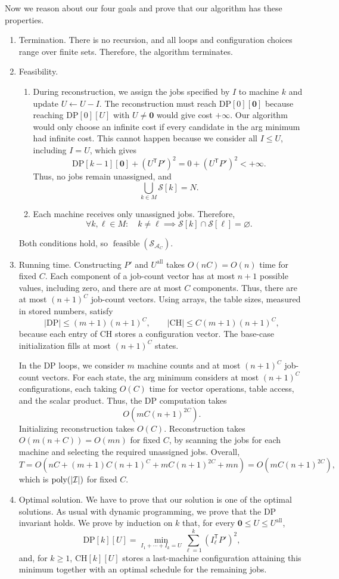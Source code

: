 \documentclass[12pt,a4paper]{article}
\begin{document}
Now we reason about our four goals and prove that our algorithm has these properties.
\begin{enumerate}
\item Termination. There is no recursion, and all loops and configuration
choices range over finite sets. Therefore, the algorithm terminates.
\item Feasibility.
\begin{enumerate}
\item During reconstruction, we assign the jobs specified by $I$ to machine
$k$ and update $U\gets U-I$. The reconstruction must reach
$\mathrm{DP}[0][\mathbf{0}]$ because reaching $\mathrm{DP}[0][U]$ with
$U\neq\mathbf{0}$ would give cost $+\infty$. Our algorithm would only
choose an infinite cost if every candidate in the arg minimum had infinite
cost. This cannot happen because we consider all $I\leq U$, including $I=U$,
which gives
\[
\mathrm{DP}[k-1][\mathbf{0}]+(U^{\mathsf T}P')^2
=0+(U^{\mathsf T}P')^2<+\infty.
\]
Thus, no jobs remain unassigned, and
\[
\bigcup_{k\in M}\mathcal{S}[k]=N.
\]
\item Each machine receives only unassigned jobs. Therefore,
\[
\forall k,\ell\in M:\quad
k\neq\ell\implies\mathcal{S}[k]\cap\mathcal{S}[\ell]=\varnothing.
\]
\end{enumerate}
Both conditions hold, so $\operatorname{feasible}(\mathcal{S}_{\mathcal{A}_C})$.
\item Running time. Constructing $P'$ and $U^{\mathrm{all}}$ takes
$O(nC)=O(n)$ time for fixed $C$. Each component of a job-count vector
has at most $n+1$ possible values, including zero, and there are at most
$C$ components. Thus, there are at most $(n+1)^C$ job-count vectors.
Using arrays, the table sizes, measured in stored numbers, satisfy
\[
|\mathrm{DP}|\leq(m+1)(n+1)^C,\qquad
|\mathrm{CH}|\leq C(m+1)(n+1)^C,
\]
because each entry of $\mathrm{CH}$ stores a configuration vector.
The base-case initialization fills at most $(n+1)^C$ states.

In the DP loops, we consider $m$ machine counts and at most $(n+1)^C$
job-count vectors. For each state, the arg minimum considers at most
$(n+1)^C$ configurations, each taking $O(C)$ time for vector operations,
table access, and the scalar product. Thus, the DP computation takes
\[
O\!\left(mC(n+1)^{2C}\right).
\]
Initializing reconstruction takes $O(C)$. Reconstruction takes $O(m(n+C))=O(mn)$
for fixed $C$, by scanning the jobs for each machine and selecting the
required unassigned jobs. Overall,
\[
T=O\!\left(nC+(m+1)C(n+1)^C+mC(n+1)^{2C}+mn\right)
=O\!\left(mC(n+1)^{2C}\right),
\]
which is $\operatorname{poly}(|\mathcal{I}|)$ for fixed $C$.
\item Optimal solution. We have to prove that our solution is one of the
optimal solutions. As usual with dynamic programming, we prove that the
DP invariant holds. We prove by induction on $k$ that, for every
$\mathbf{0}\leq U\leq U^{\mathrm{all}}$,
\[
\mathrm{DP}[k][U]
=\min_{I_1+\cdots+I_k=U}
\sum_{\ell=1}^{k}(I_\ell^{\mathsf T}P')^2,
\]
and, for $k\geq1$, $\mathrm{CH}[k][U]$ stores a last-machine
configuration attaining this minimum together with an optimal schedule
for the remaining jobs.


\end{enumerate}
\end{document}
